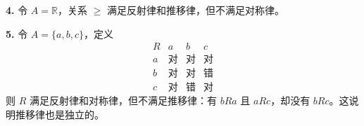 \textbf{4.} 令 $A=\mathbb R$，关系 $\ge$ 满足反射律和推移律，但不满足对称律。

\textbf{5.} 令 $A=\{a,b,c\}$，定义
\[
\begin{array}{c|ccc}
R&a&b&c\\\hline
 a&\text{对}&\text{对}&\text{对}\\
 b&\text{对}&\text{对}&\text{错}\\
 c&\text{对}&\text{错}&\text{对}
\end{array}
\]
则 $R$ 满足反射律和对称律，但不满足推移律：有 $bRa$ 且 $aRc$，却没有 $bRc$。这说明推移律也是独立的。
